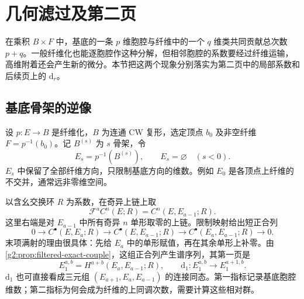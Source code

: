 
% 
% 

\section{几何滤过及第二页}
\label{g2:sec:1101}

在乘积 \(B\times F\) 中，基底的一条 \(p\) 维胞腔与纤维中的一个 \(q\) 维类共同贡献总次数 \(p+q\)。一般纤维化也能逐胞腔作这种分解，但相邻胞腔的系数要经过纤维运输，高维附着还会产生新的微分。本节把这两个现象分别落实为第二页中的局部系数和后续页上的 \(\mathrm d_r\)。

\subsection{基底骨架的逆像}
\label{g2:subsec:1101:01}

设 \(p:E\to B\) 是纤维化，\(B\) 为连通 CW 复形，选定顶点 \(b_0\) 及非空纤维 \(F=p^{-1}(b_0)\)。记 \(B^{(s)}\) 为 \(s\) 骨架，令
\begin{equation}\label{g2:eq:serre-skeletal-filtration}
	E_s=p^{-1}(B^{(s)}),\qquad E_s=\varnothing\quad(s<0).
\end{equation}
\(E_s\) 中保留了全部纤维方向，只限制基底方向的维数。例如 \(E_0\) 是各顶点上纤维的不交并，通常远非零维空间。

\ProseParagraphBreak

以含幺交换环 \(R\) 为系数，在奇异上链上取
\[
	\mathcal F^a C^n(E;R)=C^n(E,E_{a-1};R).
\]
这里右端是对 \(E_{a-1}\) 中所有奇异 \(n\) 单形取零的上链。限制映射给出短正合列
\[
	0\longrightarrow C^\bullet(E,E_a;R)\longrightarrow C^\bullet(E,E_{a-1};R)
	\longrightarrow C^\bullet(E_a,E_{a-1};R)\longrightarrow0.
\]
末项满射的理由很具体：先给 \(E_a\) 中的单形赋值，再在其余单形上补零。由\cref{g2:prop:filtered-exact-couple}，这组正合列产生谱序列，其第一页是
\begin{equation}\label{g2:eq:serre-first-page}
	E_1^{a,b}=H^{a+b}(E_a,E_{a-1};R),\qquad
	\mathrm d_1:E_1^{a,b}\longrightarrow E_1^{a+1,b}.
\end{equation}
\(\mathrm d_1\) 也可直接看成三元组 \((E_{a+1},E_a,E_{a-1})\) 的连接同态。第一指标记录基底胞腔维数；第二指标为何会成为纤维的上同调次数，需要计算这些相对群。

